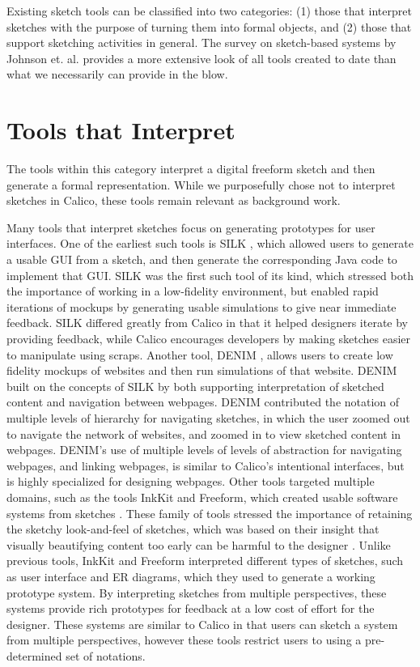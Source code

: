 \documentclass[12pt,fleqn]{ucithesis}
\begin{document}
Existing sketch tools can be classified into two categories: (1) those that interpret sketches with the purpose of turning them into formal objects, and (2) those that support sketching activities in general. The survey on sketch-based systems by Johnson et. al. \citep{Johnson} provides a more extensive look of all tools created to date than what we necessarily can provide in the blow.

\section{Tools that Interpret}
\label{relatedwork:1}

The  tools within this category interpret a digital freeform sketch and then generate a formal representation. While we purposefully chose not to interpret sketches in Calico, these tools remain relevant as background work.

Many tools that interpret sketches focus on generating prototypes for user interfaces. One of the earliest  such tools is SILK \citep{Landay}, which allowed users to generate a usable GUI from a sketch, and then generate the corresponding Java code to implement that GUI. SILK was the first such tool of its kind, which stressed both the importance of working in a low-fidelity environment, but enabled rapid iterations of mockups by generating usable simulations to give near immediate feedback. SILK differed greatly from Calico in that it helped designers iterate by providing feedback, while Calico encourages developers by making sketches easier to manipulate using scraps. Another tool, DENIM \citep{newman2003denim}, allows users to create low fidelity mockups of websites and then run simulations of that website. DENIM built on the concepts of SILK by both supporting interpretation of sketched content and navigation between webpages. DENIM contributed the notation of multiple levels of hierarchy for navigating sketches, in which the user zoomed out to navigate the network of websites, and zoomed in to view sketched content in webpages. DENIM's use of multiple levels of levels of abstraction for navigating webpages, and linking webpages, is similar to Calico's intentional interfaces, but is highly specialized for designing webpages. Other tools targeted multiple domains, such as the tools InkKit and Freeform, which created usable software systems from sketches \citep{chung2005inkkit,Plimmer}. These family of tools stressed the importance of retaining the sketchy look-and-feel of sketches, which was based on their insight that visually beautifying content too early can be harmful to the designer \citep{Shipman}. Unlike previous tools, InkKit and Freeform interpreted different types of sketches, such as user interface and ER diagrams, which they used to generate a working prototype system. By interpreting sketches from multiple perspectives, these systems provide rich prototypes for feedback at a low cost of effort for the designer. These systems are similar to Calico in that users can sketch a system from multiple perspectives, however these tools restrict users to using a pre-determined set of notations.
\end{document}
